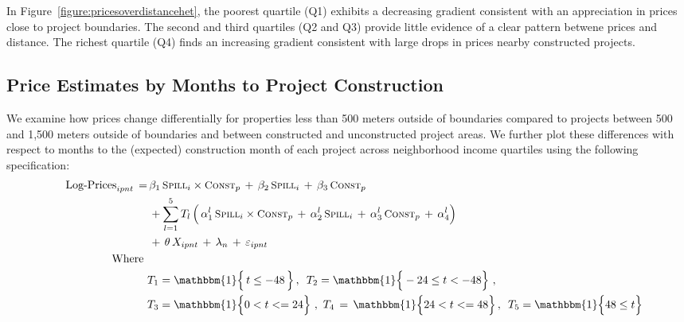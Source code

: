 \documentclass[12pt]{article}
\begin{document}
In Figure~\ref{figure:pricesoverdistancehet}, the poorest quartile (Q1) exhibits a decreasing gradient consistent with an appreciation in prices close to project boundaries.  The second and third quartiles (Q2 and Q3) provide little evidence of a clear pattern betwene prices and distance.  The richest quartile (Q4) finds an increasing gradient consistent with large drops in prices nearby constructed projects.


\subsection{Price Estimates by Months to Project Construction}\label{section:appendixpricetime}

We examine how prices change differentially for properties less than 500 meters outside of boundaries compared to projects between 500 and 1,500 meters outside of boundaries and between constructed and unconstructed project areas.  We further plot these differences with respect to months to the (expected) construction month of each project across neighborhood income quartiles using the following specification:
\begin{align*}
\quad \text{Log-Prices}_{ipnt} \, =&   \, \beta_1 \, \textsc{\small Spill}_{i}\times\textsc{\small Const}_{p} \, + \, \beta_2 \, \textsc{\small Spill}_{i} \, + \, \beta_3 \, \textsc{\small Const}_{p}\,  \\
 &\, + \sum_{l=1}^{5} T_{l} \, \Big( \, \alpha_1^{l} \, \textsc{\small Spill}_{i}\times\textsc{\small Const}_{p} \, + \, \alpha_2^{l} \, \textsc{\small Spill}_{i} \, + \, \alpha_3^{l} \, \textsc{\small Const}_{p}\, +\, \alpha_4^{l} \Big) \,  \\
&\, + \, \theta \, X_{ipnt} \, + \, \lambda_n \, + \, \varepsilon_{ipnt} \quad \\
\text{Where }& \\
&T_1 = \mathbbm{1} \Big\{\, t \leq -48  \,\Big\} \,, \,\,\, T_2 = \mathbbm{1} \Big\{ -24 \leq t < -48 \Big\} \,\,, \\
&T_3 = \mathbbm{1} \Big\{ 0< t<=24 \Big\} \,\, ,\,\,T_4\,=\,\mathbbm{1} \Big\{ 24< t <=48 \Big\} \, , \,\,\, T_5 = \mathbbm{1} \Big\{ 48 \leq t \Big\} 
\end{align*}
\end{document}
